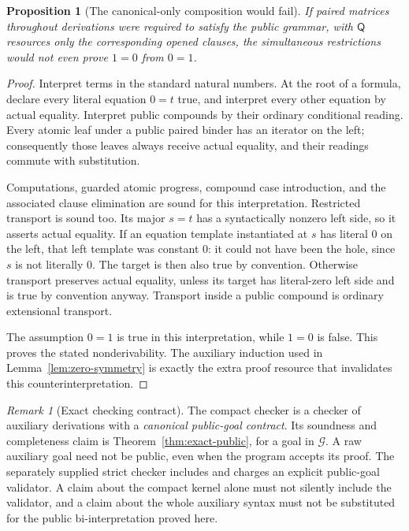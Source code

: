 \documentclass[11pt,letterpaper]{article}
\newtheorem{proposition}[theorem]{Proposition}
\theoremstyle{definition}\newtheorem{definition}[theorem]{Definition}
\theoremstyle{remark}\newtheorem{remark}[theorem]{Remark}
\newcommand{\Q}{\mathsf Q}
\newcommand{\G}{\mathcal G}
\begin{document}
\begin{proposition}[The canonical-only composition would fail]
If paired matrices throughout derivations were required to satisfy the
public grammar, with $\Q$ resources only the corresponding opened
clauses, the simultaneous restrictions would not even prove $1=0$ from
$0=1$.
\end{proposition}
\begin{proof}
Interpret terms in the standard natural numbers.  At the root of a
formula, declare every literal equation $0=t$ true, and interpret every
other equation by actual equality.  Interpret public compounds by their
ordinary conditional reading.  Every atomic leaf under a public paired
binder has an iterator on the left; consequently those leaves always
receive actual equality, and their readings commute with substitution.

Computations, guarded atomic progress, compound case introduction,
and the associated clause elimination are sound for this interpretation.
Restricted transport is sound too.  Its major $s=t$ has a syntactically
nonzero left side, so it asserts actual equality.  If an equation
template instantiated at $s$ has literal $0$ on the left, that left
template was constant $0$: it could not have been the hole, since
$s$ is not literally $0$.  The target is then also true by convention.
Otherwise transport preserves actual equality, unless its target has
literal-zero left side and is true by convention anyway.  Transport
inside a public compound is ordinary extensional transport.

The assumption $0=1$ is true in this interpretation, while $1=0$ is
false.  This proves the stated nonderivability.  The auxiliary induction
used in Lemma~\ref{lem:zero-symmetry} is exactly the extra proof resource
that invalidates this counterinterpretation.
\end{proof}

\begin{remark}[Exact checking contract]
The compact checker is a checker of auxiliary derivations with a
\emph{canonical public-goal contract}.  Its soundness and completeness
claim is Theorem~\ref{thm:exact-public}, for a goal in $\G$.  A raw
auxiliary goal need not be public, even when the program accepts its
proof.  The separately supplied strict checker includes and charges an
explicit public-goal validator.  A claim about the compact kernel alone
must not silently include the validator, and a claim about the whole
auxiliary syntax must not be substituted for the public bi-interpretation
proved here.
\end{remark}
\end{document}

